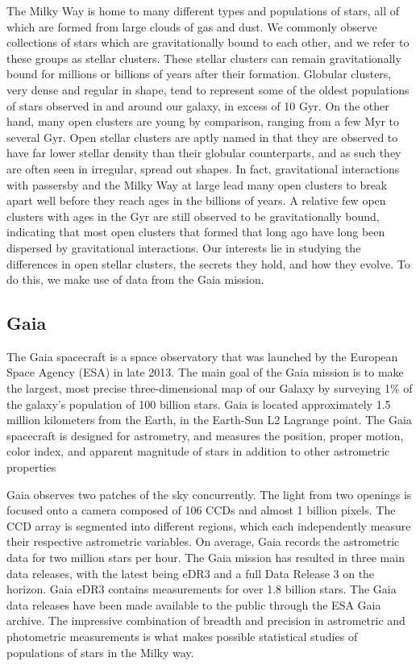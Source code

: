 \documentclass[onecolumn,table,xcdraw,super]{aastex631}
\begin{document}
The Milky Way is home to many different types and populations of stars, all of which are formed from large clouds of gas and dust. We commonly observe collections of stars which are gravitationally bound to each other, and we refer to these groups as stellar clusters. These stellar clusters can remain gravitationally bound for millions or billions of years after their formation. Globular clusters, very dense and regular in shape, tend to represent some of the oldest populations of stars observed in and around our galaxy, in excess of 10 Gyr. On the other hand, many open clusters are young by comparison, ranging from a few Myr to several Gyr. Open stellar clusters are aptly named in that they are observed to have far lower stellar density than their globular counterparts, and as such they are often seen in irregular, spread out shapes. In fact, gravitational interactions with passersby and the Milky Way at large lead many open clusters to break apart well before they reach ages in the billions of years. A relative few open clusters with ages in the Gyr are still observed to be gravitationally bound, indicating that most open clusters that formed that long ago have long been dispersed by gravitational interactions. Our interests lie in studying the differences in open stellar clusters, the secrets they hold, and how they evolve. To do this, we make use of data from the Gaia mission.

\subsection{Gaia} \label{sec:Gaia}
The Gaia spacecraft is a space observatory that was launched by the European Space Agency (ESA) in late 2013. The main goal of the Gaia mission is to make the largest, most precise three-dimensional map of our Galaxy by surveying 1\% of the galaxy's population of 100 billion stars\protect\cite{ESA}. Gaia is located approximately 1.5 million kilometers from the Earth, in the Earth-Sun L2 Lagrange point\protect\cite{ESA}. The Gaia spacecraft is designed for astrometry, and measures the position, proper motion, color index, and apparent magnitude of stars in addition to other astrometric properties

Gaia observes two patches of the sky concurrently. The light from two openings is focused onto a camera composed of 106 CCDs and almost 1 billion pixels\protect\cite{GaiaSpec}. The CCD array is segmented into different regions, which each independently measure their respective astrometric variables. On average, Gaia records the astrometric data for two million stars per hour\protect\cite{GaiaSpec}. The Gaia mission has resulted in three main data releases, with the latest being eDR3 and a full Data Release 3 on the horizon. Gaia eDR3 contains measurements for over 1.8 billion stars. The Gaia data releases have been made available to the public through the ESA Gaia archive\protect\cite{GaiaData}. The impressive combination of breadth and precision in astrometric and photometric measurements is what makes possible statistical studies of populations of stars in the Milky way.
\end{document}
